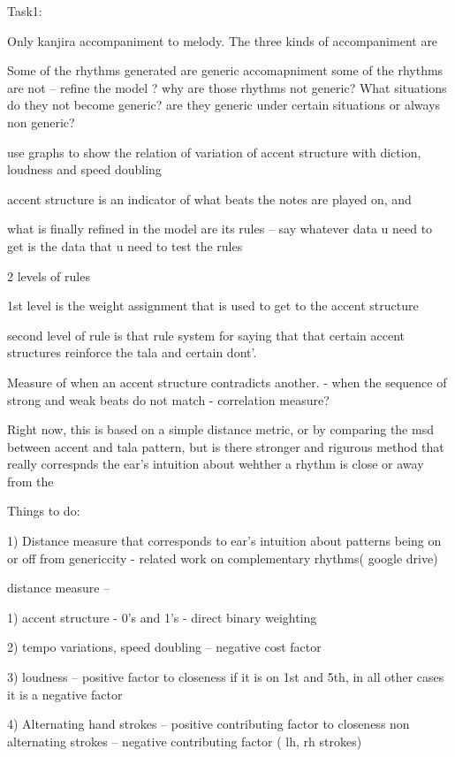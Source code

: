 Task1:

Only kanjira accompaniment to melody. The three kinds of accompaniment are 


Some of the rhythms generated are generic accomapniment
some of the rhythms are not -- refine the model ?
why are those rhythms not generic? What situations do they not become generic?
are they generic under certain situations or always non generic?


use graphs to show the relation of variation of accent structure with diction, loudness and speed doubling

accent structure is an indicator of what beats the notes are played on,
and 

what is finally refined in the model are its rules -- say
whatever data u need to get is the data that u need to test the rules

2 levels of rules

1st level is the weight assignment that is used to get to the accent structure 

second level of rule is that rule system for saying that that certain accent structures reinforce the tala and certain dont'. 

Measure of when an accent structure contradicts another.
  - when the sequence of strong and weak beats do not match
  - correlation measure?

Right now, this is based on a simple distance metric, or by comparing the msd between accent and tala pattern, but is there stronger and rigurous method that really correspnds the ear's intuition about wehther a rhythm is close or away from the 


Things to do:

1) Distance measure that corresponds to ear's intuition about patterns being on or off from  genericcity - related work on complementary rhythms( google drive)

distance measure --


1) accent structure - 0's and 1's - direct binary weighting


2) tempo variations, speed doubling -- negative cost factor 

3) loudness -- positive factor to closeness if it is on 1st and 5th, in all other cases it is a negative factor

4) Alternating hand strokes -- positive contributing factor to closeness
non alternating strokes -- negative contributing factor ( lh, rh strokes)




